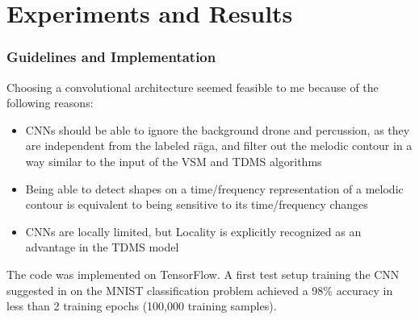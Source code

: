 \documentclass[hyperref={pdfpagelabels=false}]{beamer}
\begin{document}
     \section{Experiments and Results}
     \frame{\sectionpage}

     \begin{frame}
       \frametitle{Guidelines and Implementation}
       Choosing a convolutional architecture seemed feasible to me because of the following reasons:
       \begin{itemize}
       \item CNNs should be able to ignore the background drone and percussion, as they are independent from the labeled r\=aga, and filter out the melodic contour in a way similar to the input of the VSM and TDMS algorithms
       \item Being able to detect shapes on a time/frequency representation of a melodic contour is equivalent to being sensitive to its time/frequency changes
       \item CNNs are locally limited, but Locality is explicitly recognized as an advantage in the TDMS model
       \end{itemize}
       The code was implemented on TensorFlow. A first test setup training the CNN suggested in \cite{tf-cnn} on the MNIST classification problem achieved a 98\% accuracy in less than 2 training epochs (100,000 training samples).
     \end{frame}
\end{document}
